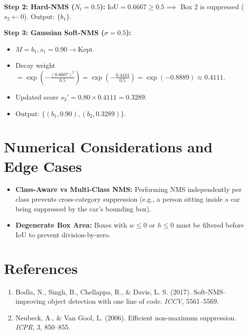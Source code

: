 \documentclass[11pt,a4paper]{article}
\theoremstyle{definition}
\begin{document}
\textbf{Step 2: Hard-NMS ($N_t = 0.5$):}
$\text{IoU} = 0.6667 \ge 0.5 \implies$ Box 2 is suppressed ($s_2 \gets 0$). Output: $\{b_1\}$.

\textbf{Step 3: Gaussian Soft-NMS ($\sigma = 0.5$):}
\begin{itemize}
    \item $M = b_1, s_1 = 0.90 \to \text{Kept}$.
    \item Decay weight $= \exp\left( -\frac{(0.6667)^2}{0.5} \right) = \exp\left(-\frac{0.4444}{0.5}\right) = \exp(-0.8889) \approx 0.4111$.
    \item Updated score $s_2' = 0.80 \times 0.4111 = 0.3289$.
    \item Output: $\{(b_1, 0.90), (b_2, 0.3289)\}$.
\end{itemize}

\section{Numerical Considerations and Edge Cases}

\begin{itemize}
    \item \textbf{Class-Aware vs Multi-Class NMS:} Performing NMS independently per class prevents cross-category suppression (e.g., a person sitting inside a car being suppressed by the car's bounding box).
    \item \textbf{Degenerate Box Area:} Boxes with $w \le 0$ or $h \le 0$ must be filtered before IoU to prevent division-by-zero.
\end{itemize}

\section{References}
\begin{enumerate}
    \item Bodla, N., Singh, B., Chellappa, R., \& Davis, L. S. (2017). Soft-NMS--improving object detection with one line of code. \emph{ICCV}, 5561--5569.
    \item Neubeck, A., \& Van Gool, L. (2006). Efficient non-maximum suppression. \emph{ICPR}, 3, 850--855.
\end{enumerate}
\end{document}
